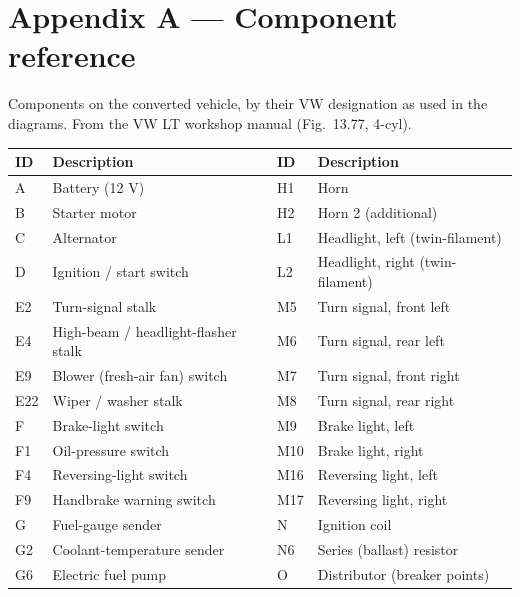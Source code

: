 \documentclass[11pt]{article}
\begin{document}
\section{Appendix A — Component reference}
{\small Components on the converted vehicle, by their VW designation as used in the diagrams. From the VW LT workshop manual (Fig.\ 13.77, 4-cyl).}\\[6pt]
\begin{center}\small
\begin{tabular}{|l|p{78mm}|l|p{78mm}|}
\hline
\textbf{ID} & \textbf{Description} & \textbf{ID} & \textbf{Description} \\ \hline
A & Battery (12 V) & H1 & Horn \\ \hline
B & Starter motor & H2 & Horn 2 (additional) \\ \hline
C & Alternator & L1 & Headlight, left (twin-filament) \\ \hline
D & Ignition / start switch & L2 & Headlight, right (twin-filament) \\ \hline
E2 & Turn-signal stalk & M5 & Turn signal, front left \\ \hline
E4 & High-beam / headlight-flasher stalk & M6 & Turn signal, rear left \\ \hline
E9 & Blower (fresh-air fan) switch & M7 & Turn signal, front right \\ \hline
E22 & Wiper / washer stalk & M8 & Turn signal, rear right \\ \hline
F & Brake-light switch & M9 & Brake light, left \\ \hline
F1 & Oil-pressure switch & M10 & Brake light, right \\ \hline
F4 & Reversing-light switch & M16 & Reversing light, left \\ \hline
F9 & Handbrake warning switch & M17 & Reversing light, right \\ \hline
G & Fuel-gauge sender & N & Ignition coil \\ \hline
G2 & Coolant-temperature sender & N6 & Series (ballast) resistor \\ \hline
G6 & Electric fuel pump & O & Distributor (breaker points) \\ \hline
\end{tabular}
\end{center}
\clearpage
\end{document}
